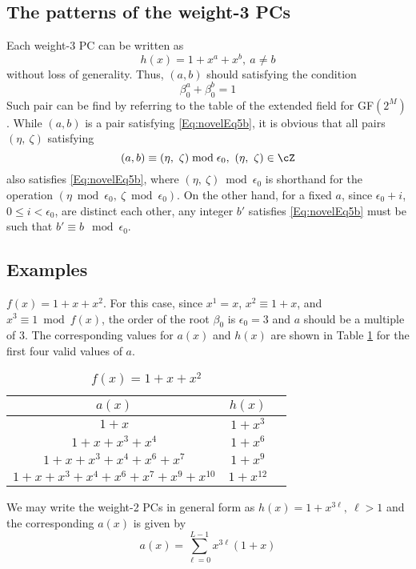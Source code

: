 \subsection{The patterns of the weight-3 PCs}

Each weight-3 PC can be written as 
\begin{equation}
h(x)=1+x^a+x^b,~a\neq b
\label{novelEqwt3}
\end{equation}
without loss of generality. 
Thus, $(a,b)$ should satisfying the condition
\begin{equation}
\beta_0^a+\beta_0^b= 1
\label{Eq:novelEq5b}
\end{equation}
Such pair can be find by referring to the table of the extended field for GF$(2^M)$. 
While $(a,b)$ is a pair satisfying \eqref{Eq:novelEq5b}, it is obvious that all pairs $(\eta,~\zeta)$ satisfying
\begin{equation}
(a,b) \equiv (\eta,~\zeta) \bmod \epsilon_0,~(\eta,~\zeta)\in \cZ
\end{equation}
also satisfies \eqref{Eq:novelEq5b}, where $(\eta,~\zeta) \bmod \epsilon_0$ is shorthand for the operation $(\eta \bmod \epsilon_0,~\zeta \bmod \epsilon_0)$. On the other hand, for a fixed $a$, since $\epsilon_0+i$, $0 \leq i < \epsilon_0$, are distinct each other, any integer $b'$ satisfies \eqref{Eq:novelEq5b} must be such that $b'\equiv b \mod \epsilon_0$.

\subsection{Examples}


\begin{example}$f(x)=1+x+x^2$.\newline 
	For this case, since $x^1=x$, $x^2 \equiv 1+x$, and $x^3 \equiv 1 \bmod f(x)$, the order of the root $\beta_0$ is $\epsilon_0=3$ and $a$ should be a multiple of $3$. The corresponding values for $a(x)$ and $h(x)$ are shown in Table \ref{novelTab2} for the first four valid values of $a$.
	\begin{table}[htbp]
		\caption{$f(x)=1+x+x^2$}
		\centering
		\begin{tabular}{c c c} 
			$a(x)$ & $h(x)$ \\ [0.5ex] 
			\hline\hline
			$1+x$
			& $1+x^{3}$ \\
			\hline
			$1+x+x^3+x^4$
			& $1+x^{6}$ 
			\\
			\hline
			$1+x+x^3+x^4+x^6+x^{7}$ 
			&  $1+x^{9}$ 
			\\
			\hline
			$1+x+x^3+x^4+x^6+x^{7}+x^9+x^{10}$
			&  $1+x^{12}$ \\
		\end{tabular}
		\label{novelTab2}
	\end{table}
	\label{ex-2}
	
	We may write the weight-2 PCs in general form as $h(x)=1+x^{3\ell},~\ell>1$ and the corresponding $a(x)$ is given by 
	\begin{equation*}
	a(x)=\sum_{\ell=0}^{L-1} x^{3\ell}(1+x)
	\end{equation*}
	\label{ex-1}
\end{example}




